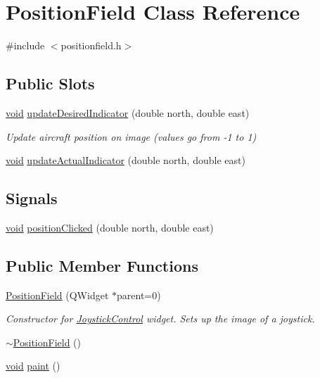 \hypertarget{class_position_field}{\section{\-Position\-Field \-Class \-Reference}
\label{class_position_field}
}


{\ttfamily \#include $<$positionfield.\-h$>$}

\subsection*{\-Public \-Slots}
\begin{DoxyCompactItemize}
\item 
\hyperlink{group___u_a_v_objects_plugin_ga444cf2ff3f0ecbe028adce838d373f5c}{void} \hyperlink{group___g_c_s_control_gadget_plugin_gaf3402b55a7601e5b8b3346b40b0f0df7}{update\-Desired\-Indicator} (double north, double east)
\begin{DoxyCompactList}\small\item\em \-Update aircraft position on image (values go from -\/1 to 1) \end{DoxyCompactList}\item 
\hyperlink{group___u_a_v_objects_plugin_ga444cf2ff3f0ecbe028adce838d373f5c}{void} \hyperlink{group___g_c_s_control_gadget_plugin_ga1945f29d366d975855609e7a8e8a1338}{update\-Actual\-Indicator} (double north, double east)
\end{DoxyCompactItemize}
\subsection*{\-Signals}
\begin{DoxyCompactItemize}
\item 
\hyperlink{group___u_a_v_objects_plugin_ga444cf2ff3f0ecbe028adce838d373f5c}{void} \hyperlink{class_position_field_acadd3cdfe6db5418792382503b60e198}{position\-Clicked} (double north, double east)
\end{DoxyCompactItemize}
\subsection*{\-Public \-Member \-Functions}
\begin{DoxyCompactItemize}
\item 
\hyperlink{group___g_c_s_control_gadget_plugin_ga41712deeb21d497420f784aacbf72e29}{\-Position\-Field} (\-Q\-Widget $\ast$parent=0)
\begin{DoxyCompactList}\small\item\em \-Constructor for \hyperlink{class_joystick_control}{\-Joystick\-Control} widget. \-Sets up the image of a joystick. \end{DoxyCompactList}\item 
\hyperlink{group___g_c_s_control_gadget_plugin_ga4d08deed807894efd521d1f56338650d}{$\sim$\-Position\-Field} ()
\item 
\hyperlink{group___u_a_v_objects_plugin_ga444cf2ff3f0ecbe028adce838d373f5c}{void} \hyperlink{group___g_c_s_control_gadget_plugin_ga24b8b76a9c4255dc4777eed27af0a5de}{paint} ()
\end{DoxyCompactItemize}
